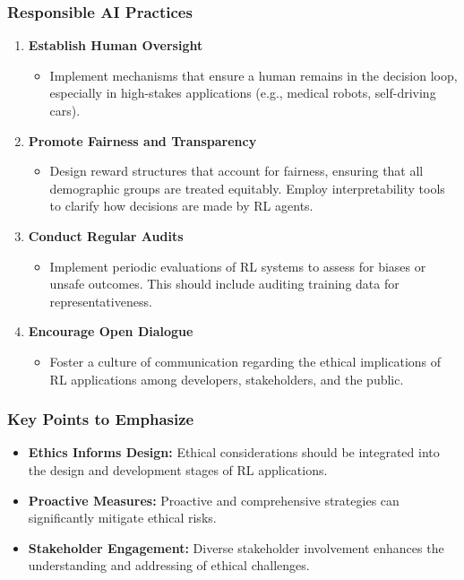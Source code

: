 \documentclass[aspectratio=169]{beamer}
\begin{document}
\begin{frame}[fragile]
    \frametitle{Responsible AI Practices}
    \begin{enumerate}
        \item \textbf{Establish Human Oversight}
            \begin{itemize}
                \item Implement mechanisms that ensure a human remains in the decision loop, especially in high-stakes applications (e.g., medical robots, self-driving cars).
            \end{itemize}

        \item \textbf{Promote Fairness and Transparency}
            \begin{itemize}
                \item Design reward structures that account for fairness, ensuring that all demographic groups are treated equitably. Employ interpretability tools to clarify how decisions are made by RL agents.
            \end{itemize}
            
        \item \textbf{Conduct Regular Audits}
            \begin{itemize}
                \item Implement periodic evaluations of RL systems to assess for biases or unsafe outcomes. This should include auditing training data for representativeness.
            \end{itemize}

        \item \textbf{Encourage Open Dialogue}
            \begin{itemize}
                \item Foster a culture of communication regarding the ethical implications of RL applications among developers, stakeholders, and the public.
            \end{itemize}
    \end{enumerate}
\end{frame}

\begin{frame}[fragile]
    \frametitle{Key Points to Emphasize}
    \begin{itemize}
        \item \textbf{Ethics Informs Design:} Ethical considerations should be integrated into the design and development stages of RL applications.
        \item \textbf{Proactive Measures:} Proactive and comprehensive strategies can significantly mitigate ethical risks.
        \item \textbf{Stakeholder Engagement:} Diverse stakeholder involvement enhances the understanding and addressing of ethical challenges.
    \end{itemize}
\end{frame}
\end{document}
